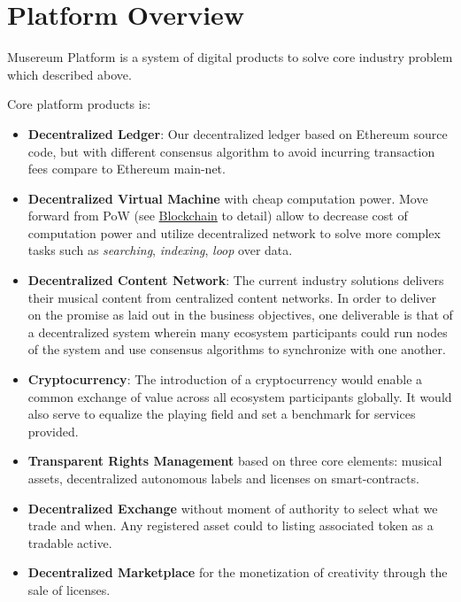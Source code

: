 \documentclass[12pt]{report}
\begin{document}
\chapter{Platform Overview}
\label{platform}
\begin{multicols}{2}
Musereum Platform is a system of digital products to solve core industry problem which described above.

Core platform products is:
\begin{itemize}
	\item \textbf{Decentralized Ledger}: Our decentralized ledger based on Ethereum source code, but with different consensus algorithm to avoid incurring transaction fees compare to Ethereum main-net.
	\item \textbf{Decentralized Virtual Machine} with cheap computation power. Move forward from PoW (see \hyperref[tech-blockchain]{Blockchain} to detail) allow to decrease cost of computation power and utilize decentralized network to solve more complex tasks such as \textit{searching}, \textit{indexing}, \textit{loop} over data.
	\item \textbf{Decentralized Content Network}: The current industry solutions  delivers their musical content from centralized content networks. In order to deliver on the promise as laid out in the business objectives, one deliverable is that of a decentralized system wherein many ecosystem participants could run nodes of the system and use consensus algorithms to synchronize
with one another.
	\item \textbf{Cryptocurrency}: The introduction of a cryptocurrency would enable a common exchange of value across all ecosystem participants globally. It would also serve to equalize the playing field and set a benchmark for services provided.
	\item \textbf{Transparent Rights Management} based on three core elements: musical assets, decentralized autonomous labels and licenses on smart-contracts.
	\item \textbf{Decentralized Exchange} without moment of authority to select what we trade and when. Any registered asset could to listing associated token as a tradable active.
	\item \textbf{Decentralized Marketplace} for the monetization of creativity through the sale of licenses.
\end{itemize}
\end{multicols}
\end{document}
